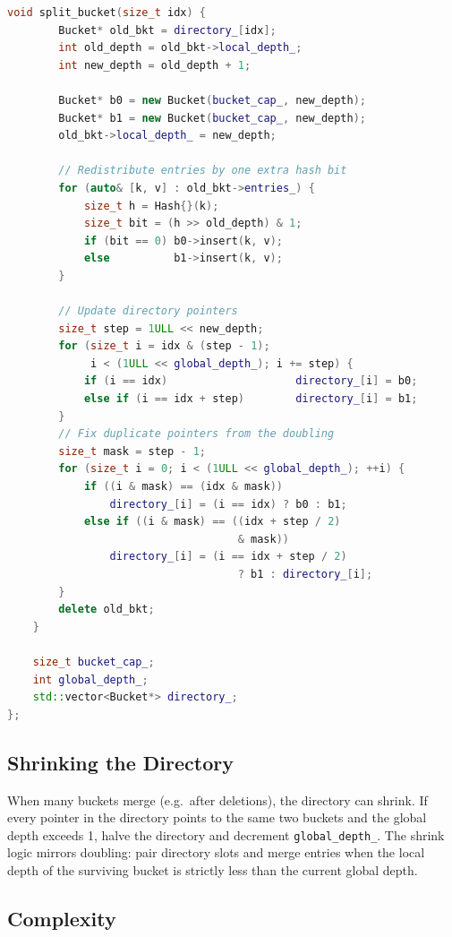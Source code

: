 \begin{lstlisting}[language=C++]
    void split_bucket(size_t idx) {
        Bucket* old_bkt = directory_[idx];
        int old_depth = old_bkt->local_depth_;
        int new_depth = old_depth + 1;

        Bucket* b0 = new Bucket(bucket_cap_, new_depth);
        Bucket* b1 = new Bucket(bucket_cap_, new_depth);
        old_bkt->local_depth_ = new_depth;

        // Redistribute entries by one extra hash bit
        for (auto& [k, v] : old_bkt->entries_) {
            size_t h = Hash{}(k);
            size_t bit = (h >> old_depth) & 1;
            if (bit == 0) b0->insert(k, v);
            else          b1->insert(k, v);
        }

        // Update directory pointers
        size_t step = 1ULL << new_depth;
        for (size_t i = idx & (step - 1);
             i < (1ULL << global_depth_); i += step) {
            if (i == idx)                    directory_[i] = b0;
            else if (i == idx + step)        directory_[i] = b1;
        }
        // Fix duplicate pointers from the doubling
        size_t mask = step - 1;
        for (size_t i = 0; i < (1ULL << global_depth_); ++i) {
            if ((i & mask) == (idx & mask))
                directory_[i] = (i == idx) ? b0 : b1;
            else if ((i & mask) == ((idx + step / 2)
                                    & mask))
                directory_[i] = (i == idx + step / 2)
                                    ? b1 : directory_[i];
        }
        delete old_bkt;
    }

    size_t bucket_cap_;
    int global_depth_;
    std::vector<Bucket*> directory_;
};
\end{lstlisting}

\subsection{Shrinking the Directory}

When many buckets merge (e.g.\ after deletions), the directory can shrink. If every pointer in the directory points to the same two buckets and the global depth exceeds 1, halve the directory and decrement \texttt{global\_depth\_}. The shrink logic mirrors doubling: pair directory slots and merge entries when the local depth of the surviving bucket is strictly less than the current global depth.

\subsection{Complexity}

